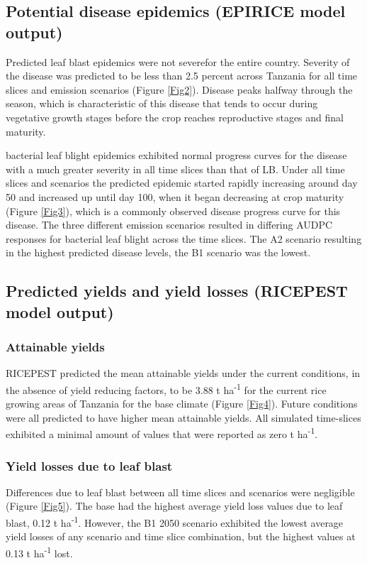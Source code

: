 \subsection{Potential disease epidemics (EPIRICE model output)}
\label{potential_epidemics}
    Predicted leaf blast epidemics were not severefor the entire country. Severity of the disease was predicted to be less than 2.5 percent across Tanzania for all time slices and emission scenarios (Figure \ref{Fig2}). Disease peaks halfway through the season, which is characteristic of this disease that tends to occur during vegetative growth stages before the crop reaches reproductive stages and final maturity.
    
    bacterial leaf blight epidemics exhibited normal progress curves for the disease with a much greater severity in all time slices than that of LB. Under all time slices and scenarios the predicted epidemic started rapidly increasing around day 50 and increased up until day 100, when it began decreasing at crop maturity (Figure \ref{Fig3}), which is a commonly observed disease progress curve for this disease. The three different emission scenarios resulted in differing AUDPC responses for bacterial leaf blight across the time slices. The A2 scenario resulting in the highest predicted disease levels, the B1 scenario was the lowest.
        
    \subsection{Predicted yields and yield losses (RICEPEST model output)}
    \label{predicted_yields}
    \subsubsection{Attainable yields}
    \label{attainable_yields}
    RICEPEST predicted the mean attainable yields under the current conditions, in the absence of yield reducing factors, to be 3.88 t ha\textsuperscript{-1} for the current rice growing areas of Tanzania for the base climate (Figure \ref{Fig4}). Future conditions were all predicted to have higher mean attainable yields. All simulated time-slices exhibited a minimal amount of values that were reported as zero t ha\textsuperscript{-1}.
    
    \subsubsection{Yield losses due to leaf blast}
    \label{lb_yield_losses}
    Differences due to leaf blast between all time slices and scenarios were negligible (Figure \ref{Fig5}). The base had the highest average yield loss values due to leaf blast, 0.12 t ha\textsuperscript{-1}. However, the B1 2050 scenario exhibited the lowest average yield losses of any scenario and time slice combination, but the highest values at 0.13 t ha\textsuperscript{-1} lost.
       
